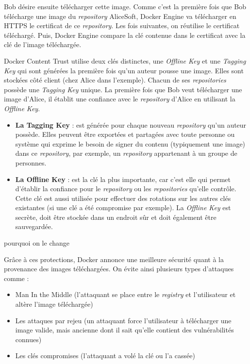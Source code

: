 \documentclass[11pt,a4paper,oneside]{report}
\begin{document}
Bob désire ensuite télécharger cette image. Comme c'est la première fois que Bob télécharge une image du \textit{repository} AliceSoft, Docker Engine va télécharger en HTTPS le certificat de ce \textit{repository}. Les fois suivantes, on réutilise le certificat téléchargé. Puis, Docker Engine compare la clé contenue dans le certificat avec la clé de l'image téléchargée.

Docker Content Trust utilise deux clés distinctes, une \textit{Offline Key} et une \textit{Tagging Key} qui sont générées la première fois qu'un auteur pousse une image. Elles sont stockées côté client (chez Alice dans l'exemple). Chacun de ses \textit{repositories} possède une \textit{Tagging Key} unique. La première fois que Bob veut télécharger une image d'Alice, il établit une confiance avec le \textit{repository} d'Alice en utilisant la \textit{Offline Key}.

\begin{itemize}
\item \textbf{La Tagging Key} : est générée pour chaque nouveau \textit{repository} qu'un auteur possède. Elles peuvent être exportées et partagées avec toute personne ou système qui exprime le besoin de signer du contenu (typiquement une image) dans ce \textit{repository}, par exemple, un \textit{repository} appartenant à un groupe de personnes.
\item \textbf{La Offline Key} : est la clé la plus importante, car c'est elle qui permet d'établir la confiance pour le \textit{repository} ou les \textit{repositories} qu'elle contrôle. Cette clé est aussi utilisée pour effectuer des rotations sur les autres clés existantes (si une clé a été compromise par exemple). La \textit{Offline Key} est secrète, doit être stockée dans un endroit sûr et doit également être sauvegardée.
\end{itemize}


pourquoi on le change

Grâce à ces protections, Docker annonce une meilleure sécurité quant à la provenance des images téléchargées. On évite ainsi plusieurs types d'attaques comme :
\begin{itemize}
\item Man In the Middle (l'attaquant se place entre le \textit{registry} et l'utilisateur et altère l'image téléchargée)
\item Les attaques par rejeu (un attaquant force l'utilisateur à télécharger une image valide, mais ancienne dont il sait qu'elle contient des vulnérabilités connues)
\item Les clés compromises (l'attaquant a volé la clé ou l'a cassée)
\end{itemize}
\end{document}
